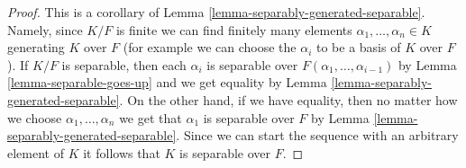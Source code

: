 \documentclass[10pt,a4paper]{amsart}
\theoremstyle{plain}
\theoremstyle{definition}
\theoremstyle{remark}
\numberwithin{equation}{subsection}
\begin{document}
\begin{proof}
This is a corollary of Lemma \ref{lemma-separably-generated-separable}.
Namely, since $K/F$ is finite we can find finitely many elements
$\alpha_1, \ldots, \alpha_n \in K$ generating $K$ over $F$ (for example
we can choose the $\alpha_i$ to be a basis of $K$ over $F$).
If $K/F$ is separable, then each $\alpha_i$ is separable over
$F(\alpha_1, \ldots, \alpha_{i - 1})$ by Lemma \ref{lemma-separable-goes-up}
and we get equality by Lemma \ref{lemma-separably-generated-separable}.
On the other hand, if we have equality, then no matter how we choose
$\alpha_1, \ldots, \alpha_n$ we get that $\alpha_1$ is separable over
$F$ by Lemma \ref{lemma-separably-generated-separable}. Since we
can start the sequence with an arbitrary element of $K$ it follows
that $K$ is separable over $F$.
\end{proof}
\end{document}
